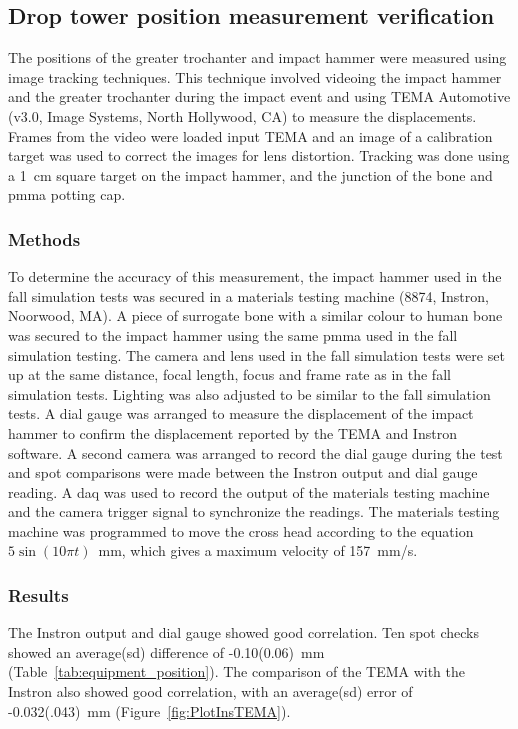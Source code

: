 \subsection{Drop tower position measurement verification}
\label{sec:equipment_position}
The positions of the greater trochanter and impact hammer were measured using image tracking techniques.
This technique involved videoing the impact hammer and the greater trochanter during the impact event and using TEMA Automotive (v3.0, Image Systems, North Hollywood, CA) to measure the displacements.
Frames from the video were loaded input TEMA and an image of a calibration target was used to correct the images for lens distortion.
Tracking was done using a 1~\ac{cm} square target on the impact hammer, and the junction of the bone and \acf{pmma} potting cap.

\subsubsection{Methods}
To determine the accuracy of this measurement, the impact hammer used in the fall simulation tests was secured in a materials testing machine (8874, Instron, Noorwood, MA).
A piece of surrogate bone with a similar colour to human bone was secured to the impact hammer using the same \ac{pmma} used in the fall simulation testing.
The camera and lens used in the fall simulation tests were set up at the same distance, focal length, focus and frame rate as in the fall simulation tests.
Lighting was also adjusted to be similar to the fall simulation tests.
A dial gauge was arranged to measure the displacement of the impact hammer to confirm the displacement reported by the TEMA and Instron software.
A second camera was arranged to record the dial gauge during the test and spot comparisons were made between the Instron output and dial gauge reading.
A \acl{daq} was used to record the output of the materials testing machine and the camera trigger signal to synchronize the readings.
The materials testing machine was programmed to move the cross head according to the equation $5\sin(10\pi t)$~\ac{mm}, which gives a maximum velocity of 157~\ac{mm}/\ac{s}.

\subsubsection{Results}
The Instron output and dial gauge showed good correlation.
Ten spot checks showed an average(\ac{sd}) difference of -0.10(0.06)~\ac{mm} (Table~\ref{tab:equipment_position}).
The comparison of the TEMA with the Instron also showed good correlation, with an average(\ac{sd}) error of -0.032(.043)~\ac{mm} (Figure~\ref{fig:PlotInsTEMA}).

